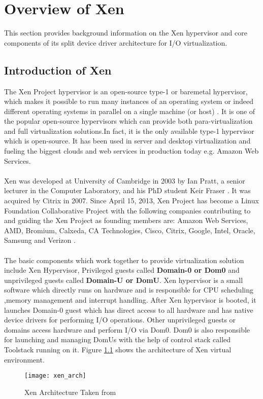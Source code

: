 \chapter{Overview of Xen\label{cha:chapter3}}
This section provides background information on the Xen hypervisor and core components of its split device driver architecture for I/O virtualization.

\section{Introduction of Xen\label{sec:xen}}
The Xen Project hypervisor is an open-source type-1 or baremetal hypervisor, which makes it possible to run many instances of an operating system or indeed different operating systems in parallel on a single machine (or host) \cite{xen}. It is one of the popular open-source hypervisors which can provide both para-virtualization and full virtualization solutions.In fact, it is the only available type-1 hypervisor which is open-source. It has been used in server and desktop virtualization and fueling the biggest clouds and web services in production today e.g. Amazon Web Services. 
\\
\\
Xen was developed at University of Cambridge in 2003 by Ian Pratt, a senior lecturer in the Computer Laboratory, and his PhD student Keir Fraser \cite{xen_wiki}. It was acquired by Citrix in 2007. Since April 15, 2013, Xen Project has become a Linux Foundation Collaborative Project with the following companies  contributing to and guiding the Xen Project as founding members are: Amazon Web Services, AMD, Bromium, Calxeda, CA Technologies, Cisco, Citrix, Google, Intel, Oracle, Samsung and Verizon \cite{xen_news}.
\\
\\
The basic components which work together to provide virtualization solution include Xen Hypervisor, Privileged guests called \textbf{Domain-0 or Dom0} and unprivileged guests called \textbf{Domain-U or DomU}. Xen hypervisor is a small software which directly runs on hardware and is responsible for CPU scheduling ,memory management and interrupt handling. After Xen hypervisor is booted, it launches Domain-0 guest which has direct access to all hardware and has native device drivers for performing I/O operations. Other unprivileged guests or domains access hardware and perform I/O via Dom0. Dom0 is also responsible for launching and managing DomUs with the help of control stack called Toolstack running on it. Figure \ref{xen_arch} shows the architecture of Xen virtual environment.
\begin{figure}[!htbp]
	\centering
	\texttt{[image: xen\_arch]}
	\caption{Xen Architecture Taken from \cite{xen_wiki}}
	\label{xen_arch}
\end{figure}
\\
\\
